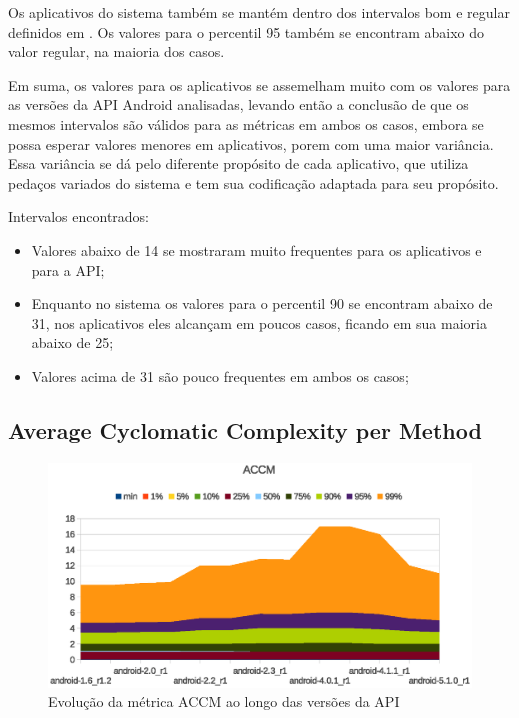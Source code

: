 Os aplicativos do sistema também se mantém dentro dos intervalos bom e regular definidos em . Os valores para o percentil 95 também se encontram abaixo do valor regular, na maioria dos casos.

Em suma, os valores para os aplicativos se assemelham muito com os valores para as versões da API Android analisadas, levando então a conclusão de que os mesmos intervalos são válidos para as métricas em ambos os casos, embora se possa esperar valores menores em aplicativos, porem com uma maior variância. Essa variância se dá pelo diferente propósito de cada aplicativo, que utiliza pedaços variados do sistema e tem sua codificação adaptada para seu propósito.

Intervalos encontrados:

\begin{itemize}
\item Valores abaixo de 14 se mostraram muito frequentes para os aplicativos e para a API;
\item Enquanto no sistema os valores para o percentil 90 se encontram abaixo de 31, nos aplicativos eles alcançam em poucos casos, ficando em sua maioria abaixo de 25;
\item Valores acima de 31 são pouco frequentes em ambos os casos;
\end{itemize}

\subsection{Average Cyclomatic Complexity per Method}

\begin{figure}[!htb]
\centering
\includegraphics [keepaspectratio=true,scale=0.85]{figuras/graphs/accm_android.eps}
\caption{Evolução da métrica ACCM ao longo das versões da API}
\label{fig:accm_android}
\end{figure}

